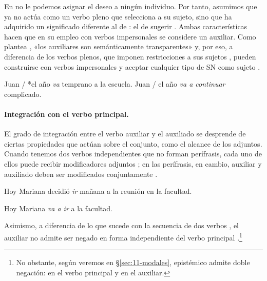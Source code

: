 En  no le podemos asignar el deseo a ningún individuo. Por
tanto, asumimos que  ya no actúa como un verbo pleno que selecciona
a su sujeto, sino que ha adquirido un significado diferente al de :
el de sugerir . Ambas características hacen que
en su empleo con verbos impersonales  se considere un auxiliar.
Como plantea \textcite[241]{ditullio2014}, «los auxiliares son semánticamente
transparentes» y, por eso, a diferencia de los verbos plenos, que imponen
restricciones a sus sujetos , pueden construirse con verbos
impersonales y aceptar cualquier tipo de SN como sujeto
.

\begin{exe}
  \ex\label{ex:11-escuela} Juan / *el año \textit{va} temprano a la escuela.
  \ex\label{ex:11-complicado} Juan / el año \textit{va a continuar} complicado.
\end{exe}

\paragraph{Integración con el verbo principal.} El grado de integración entre el
verbo auxiliar y el auxiliado se desprende de ciertas propiedades que actúan
sobre el conjunto, como el alcance de los adjuntos. Cuando tenemos dos verbos
independientes que no forman perífrasis, cada uno de ellos puede recibir
modificadores adjuntos ; en las perífrasis, en cambio,
auxiliar y auxiliado deben ser modificados conjuntamente .

\begin{exe}
  \ex\label{ex:11-mariana1} Hoy Mariana decidió \textit{ir} mañana a la reunión en
      la facultad.
  \ex\label{ex:11-mariana2}
    \begin{xlist}
      \ex Hoy Mariana \textit{va a ir} a la facultad.
    \end{xlist}
\end{exe}

Asimismo, a diferencia de lo que sucede con la secuencia de dos verbos
, el auxiliar no admite ser negado en forma independiente del
verbo principal .\footnote{No obstante, según veremos en
§\ref{sec:11-modales},  epistémico admite doble negación: en el
verbo principal y en el auxiliar.}

